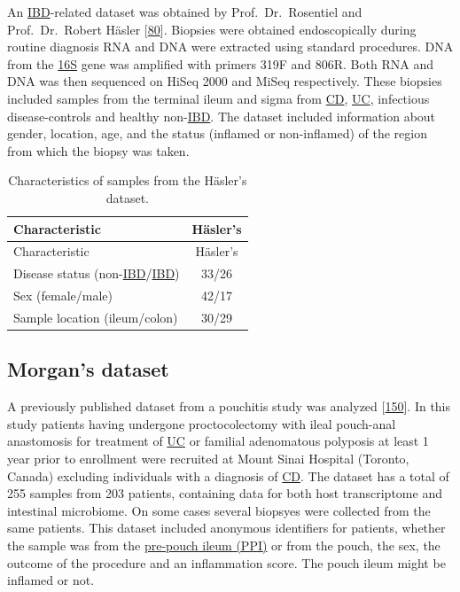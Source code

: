 \documentclass[
  12pt,
  a4paper,
  twoside,
  openright]{book}
\begin{document}
An \protect\hyperlink{acronyms_IBD}{IBD}-related dataset was obtained by Prof.~Dr.~Rosentiel and Prof.~Dr.~Robert Häsler {[}\protect\hyperlink{ref-hasler_uncoupling_2016}{80}{]}.
Biopsies were obtained endoscopically during routine diagnosis RNA and DNA were extracted using standard procedures.
DNA from the \protect\hyperlink{acronyms_16S}{16S} gene was amplified with primers 319F and 806R.
Both RNA and DNA was then sequenced on HiSeq 2000 and MiSeq respectively.
These biopsies included samples from the terminal ileum and sigma from \protect\hyperlink{acronyms_CD}{CD}, \protect\hyperlink{acronyms_UC}{UC}, infectious disease-controls and healthy non-\protect\hyperlink{acronyms_IBD}{IBD}.
The dataset included information about gender, location, age, and the status (inflamed or non-inflamed) of the region from which the biopsy was taken.

\begin{longtable}[]{@{}lc@{}}
\caption{\label{tab:Hasler} Characteristics of samples from the Häsler's dataset.}\tabularnewline
\toprule
Characteristic & Häsler's \\
\midrule
\endfirsthead
\toprule
Characteristic & Häsler's \\
\midrule
\endhead
Disease status (non-\protect\hyperlink{acronyms_IBD}{IBD}/\protect\hyperlink{acronyms_IBD}{IBD}) & 33/26 \\
Sex (female/male) & 42/17 \\
Sample location (ileum/colon) & 30/29 \\
\bottomrule
\end{longtable}

\hypertarget{methods-morgan}{%
\subsection{Morgan's dataset}\label{methods-morgan}}

A previously published dataset from a pouchitis study was analyzed {[}\protect\hyperlink{ref-morgan2015}{150}{]}.
In this study patients having undergone proctocolectomy with ileal pouch-anal anastomosis for treatment of \protect\hyperlink{acronyms_UC}{UC} or familial adenomatous polyposis at least 1 year prior to enrollment were recruited at Mount Sinai Hospital (Toronto, Canada) excluding individuals with a diagnosis of \protect\hyperlink{acronyms_CD}{CD}.
The dataset has a total of 255 samples from 203 patients, containing data for both host transcriptome and intestinal microbiome.
On some cases several biopsyes were collected from the same patients.
This dataset included anonymous identifiers for patients, whether the sample was from the \protect\hyperlink{acronyms_PPI}{pre-pouch ileum (PPI)} or from the pouch, the sex, the outcome of the procedure and an inflammation score.
The pouch ileum might be inflamed or not.
\end{document}

